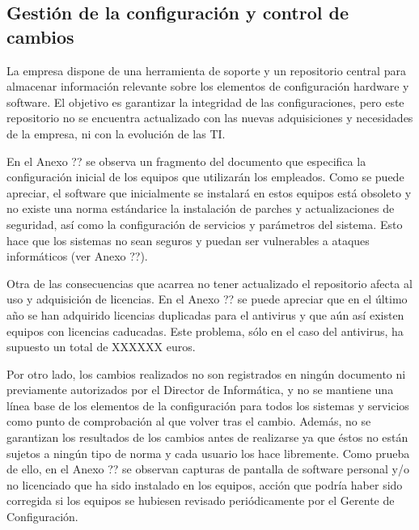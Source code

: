 \subsection {Gestión de la configuración y control de cambios}

\begin{spacing}{1.4}

La empresa dispone de una herramienta de soporte y un repositorio central para almacenar información relevante sobre los elementos de configuración hardware y software. El objetivo es garantizar la integridad de las configuraciones, pero este repositorio no se encuentra actualizado con las nuevas adquisiciones y necesidades de la empresa, ni con la evolución de las TI.

En el Anexo ?? se observa un fragmento del documento que especifica la configuración inicial de los equipos que utilizarán los empleados. Como se puede apreciar, el software que inicialmente se instalará en estos equipos está obsoleto y no existe una norma estándarice la instalación de parches y actualizaciones de seguridad, así como la configuración de servicios y parámetros del sistema. Esto hace que los sistemas no sean seguros y puedan ser vulnerables a ataques informáticos (ver Anexo ??).

Otra de las consecuencias que acarrea no tener actualizado el repositorio afecta al uso y adquisición de licencias. En el Anexo ?? se puede apreciar que en el último año se han adquirido licencias duplicadas para el antivirus y que aún así existen equipos con licencias caducadas. Este problema, sólo en el caso del antivirus, ha supuesto un total de XXXXXX euros.

Por otro lado, los cambios realizados no son registrados en ningún documento ni previamente autorizados por el Director de Informática, y no se mantiene una línea base de los elementos de la configuración para todos los sistemas y servicios como punto de comprobación al que volver tras el cambio. Además, no se garantizan los resultados de los cambios antes de realizarse ya que éstos no están sujetos a ningún tipo de norma y cada usuario los hace libremente. Como prueba de ello, en el Anexo ?? se observan capturas de pantalla de software personal y/o no licenciado que ha sido instalado en los equipos, acción que podría haber sido corregida si los equipos se hubiesen revisado periódicamente por el Gerente de Configuración.

\end{spacing}